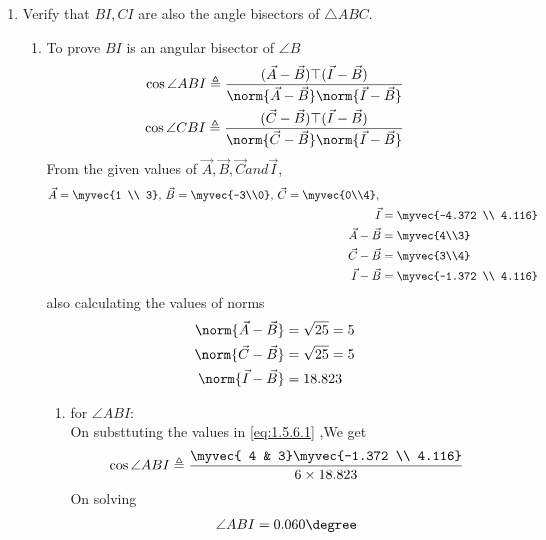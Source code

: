 \documentclass[11pt]{book}
\begin{document}
\begin{enumerate}[label=\thesection.\arabic*.,ref=\thesection.\theenumi]
\item Verify that $BI, CI$ are also the angle bisectors of $\triangle ABC$. \\
\solution
\begin{enumerate}
    \item To prove $BI$ is an angular bisector of $ \angle B$
\begin{align}
\label{eq:1.5.6.1}
\cos{\angle ABI} \triangleq \frac{(\vec{A}-\vec{B})\top(\vec{I}-\vec{B})}{\norm{\vec{A}-\vec{B}}\norm{\vec{I}-\vec{B}}} \\
\cos{\angle CBI} \triangleq \frac{(\vec{C}-\vec{B})\top(\vec{I}-\vec{B})}{\norm{\vec{C}-\vec{B}}\norm{\vec{I}-\vec{B}}} 
\end{align}
From the given values of $\vec{A},\vec{B},\vec{C} and \vec{I}$,\\
\begin{align}
    \vec{A}=\myvec{1 \\ 3},\,
\vec{B}=\myvec{-3\\0},\,
	\vec{C}=\myvec{0\\4},\, \\
 \vec{I} &= \myvec{-4.372 \\ 4.116} \\
	\vec{A}-\vec{B} &=\myvec{4\\3} \\
	\vec{C}-\vec{B}&= \myvec{3\\4} \\
 \vec{I}-\vec{B}  &=\myvec{-1.372 \\ 4.116}
\end{align}
also calculating the values of norms
\begin{align}
	\norm{\vec{A}-\vec{B}} &= \sqrt{25}= 5\\
	\norm{\vec{C}-\vec{B}} &= \sqrt{25} = 5\\
 	\norm{\vec{I}-\vec{B}} &= 18.823 \\
\end{align}


\begin{enumerate}
    \item for $\angle ABI$: \\
    On substtuting the values in  \eqref{eq:1.5.6.1} ,We get 
    \begin{align}
        \cos{\angle ABI} \triangleq \frac{\myvec{ 4 & 3}\myvec{-1.372 \\ 4.116}}{ 6\times 18.823} \\
    \end{align}
    On solving 
    \begin{align}
        \angle ABI = 0.060 \degree
    \end{align}
    

\end{enumerate}
\end{enumerate}
\end{enumerate}
\end{document}
